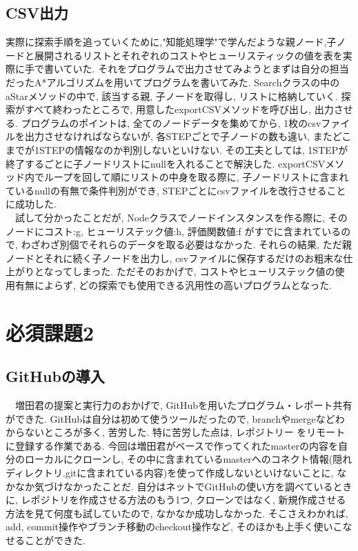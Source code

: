 \documentclass[uplatex,12pt]{jsarticle}
\begin{document}
\subsection{CSV出力}
  実際に探索手順を追っていくために,"知能処理学"で学んだような親ノード,子ノードと展開されるリストとそれぞれのコストやヒューリスティックの値を表を実際に手で書いていた. それをプログラムで出力させてみようとまずは自分の担当だったA*アルゴリズムを用いてプログラムを書いてみた. Searchクラスの中のaStarメソッドの中で, 該当する親, 子ノードを取得し, リストに格納していく. 探索がすべて終わったところで, 用意したexportCSVメソッドを呼び出し, 出力させる. プログラムのポイントは, 全てのノードデータを集めてから, 1枚のcsvファイルを出力させなければならないが, 各STEPごとで子ノードの数も違い, またどこまでが1STEPの情報なのか判別しないといけない. その工夫としては, 1STEPが終了するごとに子ノードリストにnullを入れることで解決した. exportCSVメソッド内でループを回して順にリストの中身を取る際に, 子ノードリストに含まれているnullの有無で条件判別ができ, STEPごとにcsvファイルを改行させることに成功した.\\
　試して分かったことだが, Nodeクラスでノードインスタンスを作る際に, そのノードにコスト:g, ヒューリステック値:h, 評価関数値:f がすでに含まれているので, わざわざ別個でそれらのデータを取る必要はなかった. それらの結果, ただ親ノードとそれに続く子ノードを出力し, csvファイルに保存するだけのお粗末な仕上がりとなってしまった. ただそのおかげで, コストやヒューリステック値の使用有無によらず, どの探索でも使用できる汎用性の高いプログラムとなった. 

\section{必須課題2}
\subsection{GitHubの導入}
　増田君の提案と実行力のおかげで, GitHubを用いたプログラム・レポート共有ができた. GitHubは自分は初めて使うツールだったので, branchやmergeなどわからないところが多く, 苦労した. 特に苦労した点は, レポジトリー をリモートに登録する作業である. 今回は増田君がベースで作ってくれたmasterの内容を自分のローカルにクローンし, その中に含まれているmasterへのコネクト情報(隠れディレクトリ.gitに含まれている内容)を使って作成しないといけないことに, なかなか気づけなかったことだ. 自分はネットでGitHubの使い方を調べているときに, レポジトリを作成させる方法のもう1つ, クローンではなく, 新規作成させる方法を見て何度も試していたので, なかなか成功しなかった. そこさえわかれば, add, commit操作やブランチ移動のcheckout操作など, そのほかも上手く使いこなせることができた.
\end{document}
